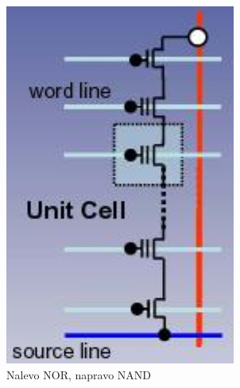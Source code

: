 \begin{figure}[h!]
\begin{minipage}[b]{0.4\textwidth}
        \includegraphics[width=\textwidth]{img/NAND.png}
    \end{minipage}
    \caption*{Nalevo NOR, napravo NAND}
\end{figure}


